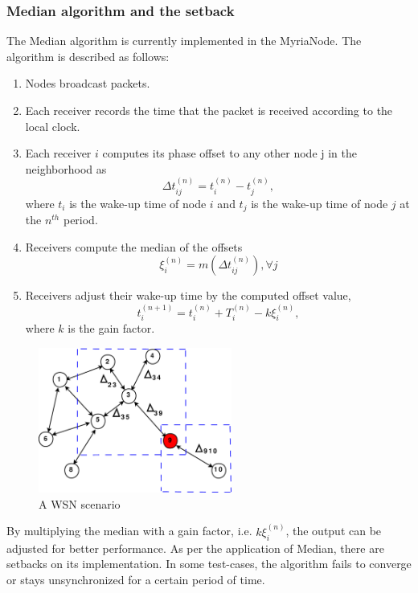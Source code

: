 \documentclass[journal]{IEEEtran}
\begin{document}
\subsubsection{\textbf{Median algorithm and the setback}}
The Median algorithm is currently implemented in the MyriaNode.
The algorithm is described as follows:
\begin{enumerate}
\item Nodes broadcast packets.
\item Each receiver records the time that the packet is received according to the local clock.
\item Each receiver $i$ computes its phase offset to
any other node j in the neighborhood as 
\begin{equation}
\Delta t_{ij}^{(n)} = t_i^{(n)} - t_j^{(n)} ,
\end{equation}
where $t_i$ is the wake-up time of node $i$ and $t_j$ is the wake-up
time of node $j$ at the $n^{th}$ period.
\item Receivers compute the median of the offsets
\begin{equation}
\xi_i^{(n)} = m(\Delta t_{ij}^{(n)}) , \forall j
\end{equation}
\item Receivers adjust their wake-up time by the computed offset value,
\begin{equation}
t_{i}^{(n+1)} = t_i^{(n)} + T_i^{(n)} - k\xi_i^{(n)},
\end{equation}
where $k$ is the gain factor.
\end{enumerate}
\begin{figure}[b]
\centering
\includegraphics[width=2.5in]{node_field}
\caption{A WSN scenario} \label{wsn}
\end{figure}
By multiplying the median with a gain factor,
i.e. $k\xi_i^{(n)}$, the output can be adjusted for better
performance. 
\newline As per the application of Median, there are setbacks on its implementation. In some test-cases, the algorithm fails to converge or stays unsynchronized for a certain period of time. 
\end{document}
